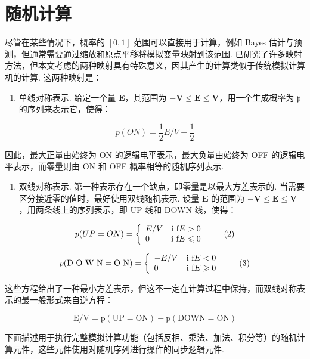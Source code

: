 \section{随机计算}

尽管在某些情况下，概率的 $[0, 1]$ 范围可以直接用于计算，例如 Bayes 估计与预测，但通常需要通过缩放和原点平移将模拟变量映射到该范围. 已研究了许多映射方法，但本文考虑的两种映射具有特殊意义，因其产生的计算类似于传统模拟计算机的计算. 这两种映射是：

\begin{enumerate}
    \item[(i)] 单线对称表示. 给定一个量 $\mathbf{E}$，其范围为 $-\mathbf{V} \leqslant \mathbf{E} \leqslant \mathbf{V}$，用一个生成概率为 $\mathfrak{p}$ 的序列来表示它，使得：
\end{enumerate}

\[
p (O N) = \frac {1}{2} E / V + \frac {1}{2} \tag {1}
\]

因此，最大正量由始终为 ON 的逻辑电平表示，最大负量由始终为 OFF 的逻辑电平表示，而零量则由 ON 和 OFF 概率相等的随机序列表示.

\begin{enumerate}
    \item[(ii)] 双线对称表示. 第一种表示存在一个缺点，即零量是以最大方差表示的. 当需要区分接近零的值时，最好使用双线随机表示. 设量 $\mathbf{E}$ 的范围为 $-\mathbf{V} \leqslant \mathbf{E} \leqslant \mathbf{V}$，用两条线上的序列表示，即 UP 线和 DOWN 线，使得：
\end{enumerate}

\[
p (U P = O N) = \left\{ \begin{array}{l l} E / V & \text {i f} E > 0 \\ 0 & \text {i f} E \leqslant 0 \end{array} \right. \tag {2}
\]

\[
p (\text {D O W N} = \text {O N}) = \left\{ \begin{array}{l l} - E / V & \text {i f} E <   0 \\ 0 & \text {i f} E \geqslant 0 \end{array} \right. \tag {3}
\]

这些方程给出了一种最小方差表示，但这不一定在计算过程中保持，而双线对称表示的最一般形式来自逆方程：

\[
\mathrm {E} / \mathrm {V} = \mathrm {p} (\mathrm {U P} = \mathrm {O N}) - \mathrm {p} (\mathrm {D O W N} = \mathrm {O N}) \tag {4}
\]

下面描述用于执行完整模拟计算功能（包括反相、乘法、加法、积分等）的随机计算元件，这些元件使用对随机序列进行操作的同步逻辑元件.
